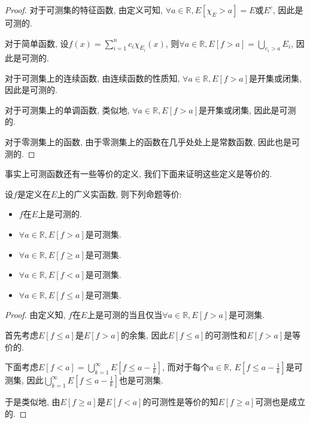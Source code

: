 \documentclass[theorem=false,mathfont=none,openany,sub3section]{easybook}
\begin{document}
\begin{proof}
  对于可测集的特征函数, 由定义可知, $\forall a\in \mathbb{R}, E[\chi_E > a] = E$或$E^c$, 因此是可测的.\par
  对于简单函数, 设$f(x)=\sum_{i=1}^{n}c_i\chi_{E_i}(x)$, 则$\forall a\in \mathbb{R}, E[f>a]=\bigcup_{c_i>a}E_i$, 因此是可测的.\par
  对于可测集上的连续函数, 由连续函数的性质知, $\forall a\in \mathbb{R}, E[f>a]$是开集或闭集, 因此是可测的.\par
  对于可测集上的单调函数, 类似地, $\forall a\in \mathbb{R}, E[f>a]$是开集或闭集, 因此是可测的.\par
  对于零测集上的函数, 由于零测集上的函数在几乎处处上是常数函数, 因此也是可测的.\par
\end{proof}

事实上可测函数还有一些等价的定义, 我们下面来证明这些定义是等价的.\par

\begin{theorem}
  设$f$是定义在$E$上的广义实函数, 则下列命题等价:\par
  \begin{itemize}
    \item $f$在$E$上是可测的.
    \item $\forall a\in \mathbb{R}, E[f>a]$是可测集.
    \item $\forall a\in \mathbb{R}, E[f\geqslant a]$是可测集.
    \item $\forall a\in \mathbb{R}, E[f<a]$是可测集.
    \item $\forall a\in \mathbb{R}, E[f\leqslant a]$是可测集.
  \end{itemize}
\end{theorem}

\begin{proof}
  由定义知, $f$在$E$上是可测的当且仅当$\forall a\in \mathbb{R}, E[f>a]$是可测集.\par
  首先考虑$E[f\leqslant a]$是$E[f>a]$的余集, 因此$E[f\leqslant a]$的可测性和$E[f>a]$是等价的.\par
  下面考虑$E[f<a]=\bigcup_{k=1}^{\infty}E[f\leqslant a-\frac{1}{k}]$, 而对于每个$a\in \mathbb{R}$, $E[f\leqslant a-\frac{1}{k}]$是可测集, 因此$\bigcup_{k=1}^{\infty}E[f\leqslant a-\frac{1}{k}]$也是可测集.\par
  于是类似地, 由$E[f\geqslant a]$是$E[f<a]$的可测性是等价的知$E[f\geqslant a]$可测也是成立的.\par
\end{proof}
\end{document}
